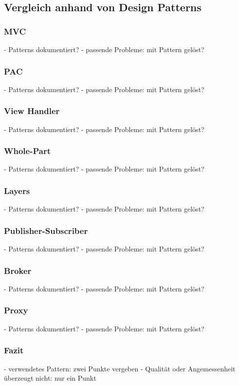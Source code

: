 \color{red}

\subsection{Vergleich anhand von Design Patterns}

\subsubsection{MVC}
- Patterns dokumentiert?
- passende Probleme: mit Pattern gelöst?

\subsubsection{PAC}
- Patterns dokumentiert?
- passende Probleme: mit Pattern gelöst?

\subsubsection{View Handler}
- Patterns dokumentiert?
- passende Probleme: mit Pattern gelöst?

\subsubsection{Whole-Part}
- Patterns dokumentiert?
- passende Probleme: mit Pattern gelöst?

\subsubsection{Layers}
- Patterns dokumentiert?
- passende Probleme: mit Pattern gelöst?

\subsubsection{Publisher-Subscriber}
- Patterns dokumentiert?
- passende Probleme: mit Pattern gelöst?

\subsubsection{Broker}
- Patterns dokumentiert?
- passende Probleme: mit Pattern gelöst?

\subsubsection{Proxy}
- Patterns dokumentiert?
- passende Probleme: mit Pattern gelöst?

\subsubsection{Fazit}
- verwendetes Pattern: zwei Punkte vergeben
- Qualität oder Angemessenheit überzeugt nicht: nur ein Punkt

\color{black}
